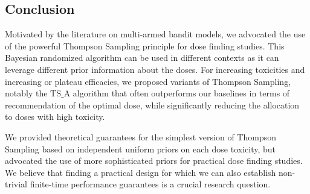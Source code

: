 

\subsection{Conclusion}\label{sec:Conclusion}

Motivated by the literature on multi-armed bandit models, we advocated the use of the powerful Thompson Sampling principle for dose finding studies. This Bayesian randomized algorithm can be used in different contexts as it can leverage different prior information about the doses. For increasing toxicities and increasing or plateau efficacies, we proposed variants of Thompson Sampling, notably the $\mathrm{TS}\_\mathrm{A}$ algorithm that often outperforms our baselines in terms of recommendation of the optimal dose, while significantly reducing the allocation to doses with high toxicity. 

We provided theoretical guarantees for the simplest version of Thompson Sampling based on independent uniform priors on each dose toxicity, but advocated the use of more sophisticated priors for practical dose finding studies. We believe that finding a practical design for which we can also establish non-trivial finite-time performance guarantees is a crucial research question. 

% 
% 


